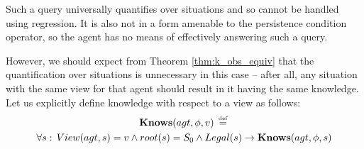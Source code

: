Such a query universally quantifies over situations and so cannot
be handled using regression. It is also not in a form amenable to
the persistence condition operator, so the agent has no means of effectively
answering such a query.

However, we should expect from Theorem \ref{thm:k_obs_equiv} that
the quantification over situations is unnecessary in this case --
after all, any situation with the same view for that agent should
result in it having the same knowledge. Let us explicitly define knowledge
with respect to a view as follows:\begin{multline*}
\mathbf{Knows}(agt,\phi,v)\,\stackrel{\mbox{\tiny def}}{=}\,\\
\forall s:\, View(agt,s)=v\wedge root(s)=S_{0}\wedge Legal(s)\rightarrow\mathbf{Knows}(agt,\phi,s)\end{multline*}


